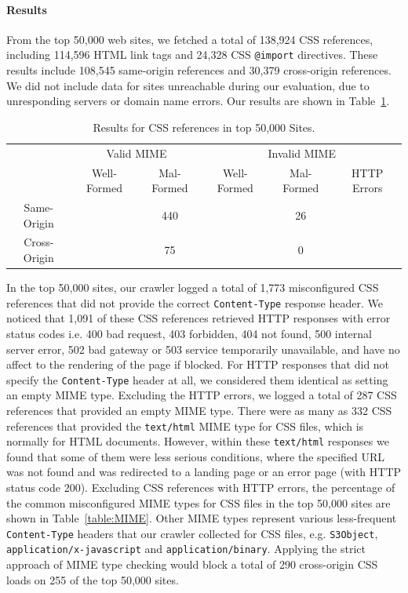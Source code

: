 \documentclass{acm_proc_article-sp}
\begin{document}
\paragraph{Results}
From the top 50,000 web sites, we fetched a total of 138,924 CSS references, including 114,596 HTML link tags and 24,328 CSS \texttt{@import} directives. These results include 108,545 same-origin references and 30,379 cross-origin references. We did not include data for sites unreachable during our evaluation, due to unresponding servers or domain name errors. Our results are shown in Table~\ref{table:results}.

\begin{table}
\centering
\begin{tabular}{|c|c|c|c|c|c|} \hline
&\multicolumn{2}{|c}{Valid MIME}&\multicolumn{3}{|c|}{Invalid MIME}\\ %
\cline{2-6}
&Well-Formed&Mal-Formed&Well-Formed&Mal-Formed&HTTP Errors\\ \hline
Same-Origin&&440&&26&\\ \hline
Cross-Origin&&75&&0&\\
\hline\end{tabular}
\caption{Results for CSS references in top 50,000 Sites.}
\label{table:results}
\end{table}

In the top 50,000 sites, our crawler logged a total of 1,773 misconfigured CSS references that did not provide the correct \texttt{Content-Type} response header. We noticed that 1,091 of these CSS references retrieved HTTP responses with error status codes i.e. 400 bad request, 403 forbidden, 404 not found, 500 internal server error, 502 bad gateway or 503 service temporarily unavailable, and have no affect to the rendering of the page if blocked. For HTTP responses that did not specify the \texttt{Content-Type} header at all, we considered them identical as setting an empty MIME type. Excluding the HTTP errors, we logged a total of 287 CSS references that provided an empty MIME type. There were as many as 332 CSS references that provided the \verb|text/html| MIME type for CSS files, which is normally for HTML documents. However, within these \texttt{text/html} responses we found that some of them were less serious conditions, where the specified URL was not found and was redirected to a landing page or an error page (with HTTP status code 200). Excluding CSS references with HTTP errors, the percentage of the common misconfigured MIME types for CSS files in the top 50,000 sites are shown in Table~\ref{table:MIME}. Other MIME types represent various less-frequent \verb|Content-Type| headers that our crawler collected for CSS files, e.g. \verb|S3Object|, \verb|application/x-javascript| and \verb|application/binary|.
Applying the strict approach of MIME type checking would block a total of 290 cross-origin CSS loads on 255 of the top 50,000 sites.
\end{document}
